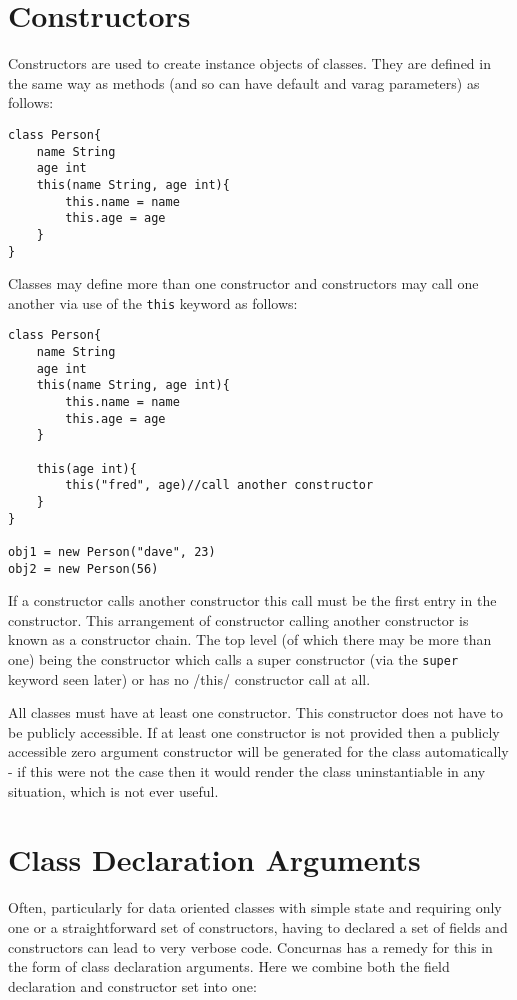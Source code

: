 \documentclass[conc-doc]{subfiles}
\begin{document}
\section{Constructors}
Constructors are used to create instance objects of classes. They are defined in the same way as methods (and so can have default and varag parameters) as follows:

\begin{lstlisting}
class Person{
	name String
	age int
	this(name String, age int){
		this.name = name
		this.age = age
	}
}
\end{lstlisting}

Classes may define more than one constructor and constructors may call one another via use of the \lstinline{this} keyword as follows:

\begin{lstlisting}
class Person{
	name String
	age int
	this(name String, age int){
		this.name = name
		this.age = age
	}
	
	this(age int){
		this("fred", age)//call another constructor
	}
}

obj1 = new Person("dave", 23)
obj2 = new Person(56)
\end{lstlisting}

If a constructor calls another constructor this call must be the first entry in the constructor. This arrangement of constructor calling another constructor is known as a constructor chain. The top level (of which there may be more than one) being the constructor which calls a super constructor (via the \lstinline{super} keyword seen later) or has no /this/ constructor call at all.

All classes must have at least one constructor. This constructor does not have to be publicly accessible. If at least one constructor is not provided then a publicly accessible zero argument constructor will be generated for the class automatically - if this were not the case then it would render the class uninstantiable in any situation, which is not ever useful.

\section{Class Declaration Arguments}
Often, particularly for data oriented classes with simple state and requiring only one or a straightforward set of constructors, having to declared a set of fields and constructors can lead to very verbose code. Concurnas has a remedy for this in the form of class declaration arguments. Here we combine both the field declaration and constructor set into one:
\end{document}
